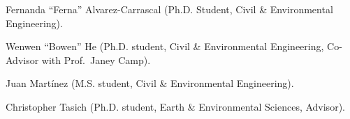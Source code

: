 \item Fernanda ``Ferna'' Alvarez-Carrascal (Ph.D. Student, Civil \&
Environmental Engineering).
\item Wenwen ``Bowen'' He (Ph.D. student, Civil \& Environmental Engineering, Co-Advisor with Prof.\ Janey Camp).
\item Juan Mart\'inez (M.S. student, Civil \& Environmental Engineering).
\item Christopher Tasich (Ph.D. student, Earth \& Environmental Sciences, Advisor).
